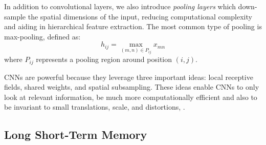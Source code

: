 In addition to convolutional layers, we also introduce \textit{pooling layers} 
which down-sample the spatial dimensions of the input, reducing computational
complexity and aiding in hierarchical feature extraction. 
The most common type of pooling is max-pooling, defined as:
\begin{equation}
    h_{ij} = \max_{(m,n) \in P_{ij}} x_{mn}
\end{equation}
where \(P_{ij}\) represents a pooling region around position $(i,j)$.

CNNs are powerful because they leverage three important ideas: local receptive fields, 
shared weights, and spatial subsampling. These ideas enable CNNs to only look at relevant information,
be much more computationally efficient and also to be invariant to small translations, scale, and distortions, \cite{ABRAMS2017}.

\subsection{Long Short-Term Memory}

